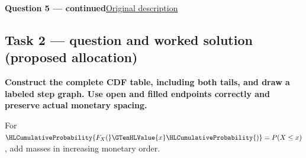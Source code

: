 \par\vspace{3mm}\secInicio[][sec:q5]

\clearpage
\textbf{Question 5 --- continued}\quad\hyperref[sec:q5]{Original description}

\subsection*{Task 2 --- question and worked solution (proposed allocation) }
\label{sol:q5t2}

\noindent\textbf{\boldmath Construct the complete CDF table, including both tails, and draw a labeled step graph. Use open and filled endpoints correctly and preserve actual monetary spacing.}\par\nopagebreak

For $\HLCumulativeProbability{F_X(}\GTenHLValue{x}\HLCumulativeProbability{)}=P(X\leq x)$, add masses in increasing monetary order.

